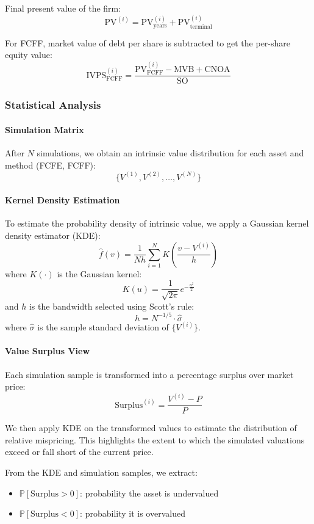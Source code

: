 Final present value of the firm:
\[
\text{PV}^{(i)} = \text{PV}_{\text{years}}^{(i)} + \text{PV}_{\text{terminal}}^{(i)}
\]

For FCFF, market value of debt per share is subtracted to get the per-share equity value:
\[
\text{IVPS}_{\text{FCFF}}^{(i)} = \frac{\text{PV}_{\text{FCFF}}^{(i)} - \text{MVB} + \text{CNOA}}{\text{SO}}
\]

\subsubsection{Statistical Analysis}

\paragraph{Simulation Matrix}

After $N$ simulations, we obtain an intrinsic value distribution for each asset and method (FCFE, FCFF):
\[
\{V^{(1)}, V^{(2)}, \ldots, V^{(N)}\}
\]

\paragraph{Kernel Density Estimation}

To estimate the probability density of intrinsic value, we apply a Gaussian kernel density estimator (KDE):
\[
\hat{f}(v) = \frac{1}{Nh} \sum_{i=1}^N K\left(\frac{v - V^{(i)}}{h}\right)
\]
where $K(\cdot)$ is the Gaussian kernel:
\[
K(u) = \frac{1}{\sqrt{2\pi}} e^{-\frac{u^2}{2}}
\]
and $h$ is the bandwidth selected using Scott's rule:
\[
h = N^{-1/5} \cdot \hat{\sigma}
\]
where $\hat{\sigma}$ is the sample standard deviation of $\{V^{(i)}\}$.

\paragraph{Value Surplus View}

Each simulation sample is transformed into a percentage surplus over market price:
\[
\text{Surplus}^{(i)} = \frac{V^{(i)} - P}{P}
\]

We then apply KDE on the transformed values to estimate the distribution of relative mispricing. This highlights the extent to which the simulated valuations exceed or fall short of the current price.

From the KDE and simulation samples, we extract:
\begin{itemize}
  \item $\mathbb{P}[\text{Surplus} > 0]$: probability the asset is undervalued
  \item $\mathbb{P}[\text{Surplus} < 0]$: probability it is overvalued
\end{itemize}

